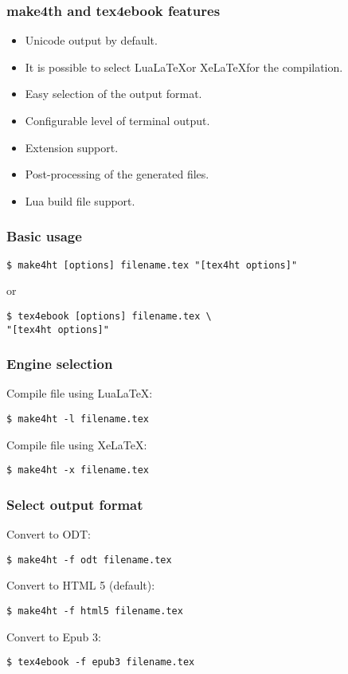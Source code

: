 \documentclass{beamer}
\begin{document}
\begin{frame}
    \frametitle{make4th and tex4ebook features}
    \begin{itemize}
      \item Unicode output by default.
      \item It is possible to select Lua\LaTeX or Xe\LaTeX for the compilation.
      \item Easy selection of the output format.
      \item Configurable level of terminal output.
      \item Extension support.
      \item Post-processing of the generated files.
      \item Lua build file support.
    \end{itemize}
  \end{frame}

\begin{frame}[fragile]
    \frametitle{Basic usage}
    \begin{verbatim}
$ make4ht [options] filename.tex "[tex4ht options]"
  \end{verbatim}
  or 
  \begin{verbatim}
$ tex4ebook [options] filename.tex \
"[tex4ht options]"
  \end{verbatim}
\end{frame}

\begin{frame}[fragile]
  \frametitle{Engine selection}
Compile file using Lua\LaTeX:
\begin{verbatim}
$ make4ht -l filename.tex
\end{verbatim}
Compile file using Xe\LaTeX:
\begin{verbatim}
$ make4ht -x filename.tex
\end{verbatim}
\end{frame}

\begin{frame}[fragile]
\frametitle{Select output format}
Convert to ODT:
\begin{verbatim}
$ make4ht -f odt filename.tex
\end{verbatim}

Convert to HTML 5 (default):

\begin{verbatim}
$ make4ht -f html5 filename.tex
\end{verbatim}

Convert to Epub 3:

\begin{verbatim}
$ tex4ebook -f epub3 filename.tex
\end{verbatim}

\end{frame}
\end{document}
